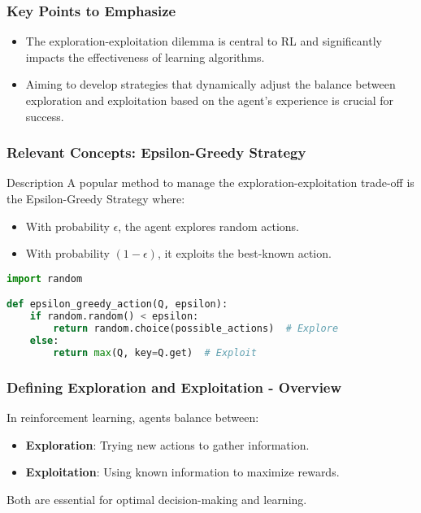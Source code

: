 \documentclass[aspectratio=169]{beamer}
\begin{document}
\begin{frame}
    \frametitle{Key Points to Emphasize}
    \begin{itemize}
        \item The exploration-exploitation dilemma is central to RL and significantly impacts the effectiveness of learning algorithms.

        \item Aiming to develop strategies that dynamically adjust the balance between exploration and exploitation based on the agent's experience is crucial for success.
    \end{itemize}
\end{frame}

\begin{frame}[fragile]
    \frametitle{Relevant Concepts: Epsilon-Greedy Strategy}
    \begin{block}{Description}
        A popular method to manage the exploration-exploitation trade-off is the Epsilon-Greedy Strategy where:
    \end{block}
    \begin{itemize}
        \item With probability $\epsilon$, the agent explores random actions.
        \item With probability $(1 - \epsilon)$, it exploits the best-known action.
    \end{itemize}
    
    \begin{lstlisting}[language=Python]
import random

def epsilon_greedy_action(Q, epsilon):
    if random.random() < epsilon:
        return random.choice(possible_actions)  # Explore
    else:
        return max(Q, key=Q.get)  # Exploit
    \end{lstlisting}
\end{frame}

\begin{frame}[fragile]
    \frametitle{Defining Exploration and Exploitation - Overview}
    In reinforcement learning, agents balance between:
    \begin{itemize}
        \item \textbf{Exploration}: Trying new actions to gather information.
        \item \textbf{Exploitation}: Using known information to maximize rewards.
    \end{itemize}
    Both are essential for optimal decision-making and learning.
\end{frame}
\end{document}
